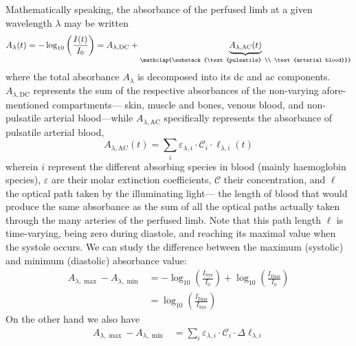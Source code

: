 Mathematically speaking, the absorbance of the perfused limb at a given wavelength $\lambda$ may be written
\begin{equation}
	A_\lambda(t) = - \log_{10}\left(\frac{I(t)}{I_0}\right) = A_{\lambda,\text{DC}} + \underbrace{A_{\lambda,\text{AC}}(t)}_{\mathclap{\substack{\text{pulsatile} \\ \text{arterial blood}}}}
\end{equation}
where the total absorbance $A_\lambda$ is decomposed into its \gls{dc} and \gls{ac} components. $A_{\lambda,\text{DC}}$ represents the sum of the respective absorbances of the non-varying afore-mentioned compartments---\ie{} skin, muscle and bones, venous blood, and non-pulsatile arterial blood---while $A_{\lambda,\text{AC}}$ specifically represents the absorbance of pulsatile arterial blood, \ie{}
\begin{equation}\label{eq:co2hb:beer_law}
	A_{\lambda,\text{AC}}(t) = \sum_{i} \varepsilon_{\lambda, i} \cdot \mathcal{C}_i \cdot \ell_{\lambda, i}(t)
\end{equation}
wherein $i$ represent the different absorbing species in blood (mainly haemoglobin species), $\varepsilon$ are their molar extinction coefficients, $\mathcal{C}$ their concentration, and $\ell$ the optical path taken by the illuminating light---\ie{} the length of blood that would produce the same absorbance as the sum of all the optical paths actually taken through the many arteries of the perfused limb. Note that this path length $\ell$ is time-varying, being zero during diastole, and reaching its maximal value when the systole occurs. We can study the difference between the maximum (systolic) and minimum (diastolic) absorbance value:
\begin{equation}\label{eq:co2hb:adiff_logi}
	\begin{aligned}
		A_{\lambda,\max} - A_{\lambda,\min} &= - \log_{10}\left(\frac{I_\text{Sys}}{I_0}\right) + \log_{10}\left(\frac{I_\text{Dias}}{I_0}\right)\\
		&= \log_{10}\left(\frac{I_\text{Dias}}{I_\text{Sys}}\right)
	\end{aligned}
\end{equation}
On the other hand we also have
\begin{equation}
	\begin{aligned}
		A_{\lambda,\max} - A_{\lambda,\min} &= \sum_{i} \varepsilon_{\lambda, i} \cdot \mathcal{C}_i \cdot \Delta\ell_{\lambda, i}
	\end{aligned}
\end{equation}
